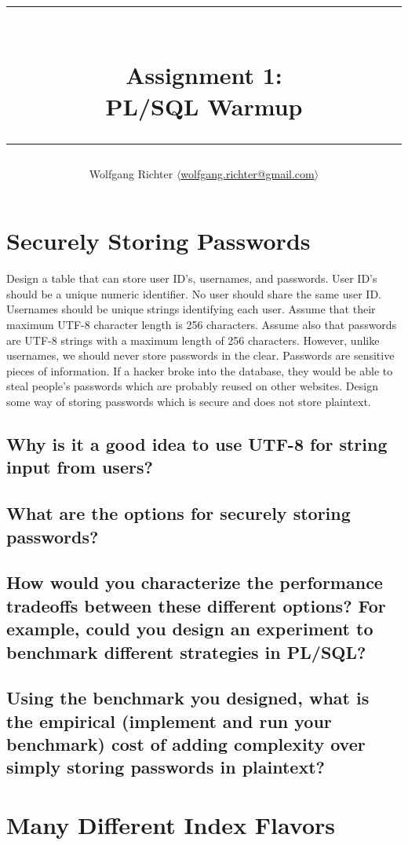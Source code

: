 \documentclass[12pt]{article}
\title{\rule{\linewidth}{0.5mm}\\
\textbf{Assignment 1:}\\
PL/SQL Warmup\\
\rule{\linewidth}{1.0mm}}
\author{Wolfgang Richter \textnormal{$\langle$}\href{mailto:wolfgang.richter@gmail.com}{wolfgang.richter@gmail.com}\textnormal{$\rangle$}}
\begin{document}
\maketitle

\section{Securely Storing Passwords}

Design a table that can store user ID's, usernames, and passwords.  User ID's
should be a unique numeric identifier.  No user should share the same user ID.
Usernames should be unique strings identifying each user.  Assume that their
maximum UTF-8 character length is 256 characters.  Assume also that passwords
are UTF-8 strings with a maximum length of 256 characters.  However, unlike
usernames, we should never store passwords in the clear.  Passwords are
sensitive pieces of information.  If a hacker broke into the database, they
would be able to steal people's passwords which are probably reused on other
websites.  Design some way of storing passwords which is secure and does not
store plaintext.

\subsection{Why is it a good idea to use UTF-8 for string input from users?}

\subsection{What are the options for securely storing passwords?}

\subsection{How would you characterize the performance tradeoffs between these
different options?  For example, could you design an experiment to benchmark
different strategies in PL/SQL?}

\subsection{Using the benchmark you designed, what is the empirical (implement
and run your benchmark) cost of adding complexity over simply storing passwords
in plaintext?}

\newpage\section{Many Different Index Flavors}
\end{document}
